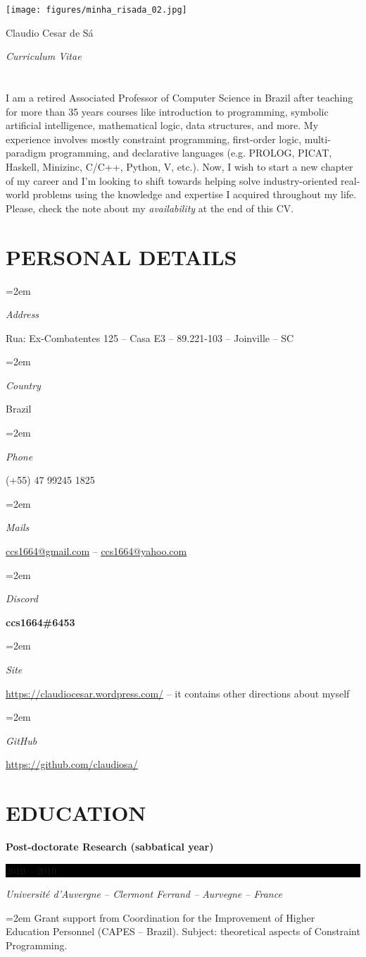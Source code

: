 \documentclass[paper=a4,fontsize=11pt]{scrartcl} %
\newlength{\spacebox}
\newcommand{\sepspace}{\vspace*{0.8em}}		%
\newcommand{\MyName}[1]{ %
		\Huge \usefont{OT1}{phv}{b}{n} \hfill #1
		\par \normalsize \normalfont}
\newcommand{\MySlogan}[1]{ %
		\large \usefont{OT1}{phv}{m}{n}\hfill \textit{#1}
		\par \normalsize \normalfont}
\newcommand{\NewPart}[1]{\section*{\uppercase{#1}}}
\newcommand{\PersonalEntry}[2]{
		\noindent\hangindent=2em\hangafter=0 %
		\parbox{\spacebox}{        %
		\textit{#1}}		       %
		\hspace{1.5em} #2 \par}    %
\newcommand{\EducationEntry}[4]{
		\noindent \textbf{#1} \hfill      %
		\colorbox{Black}{%
			\parbox{6em}{%
			\hfill\color{White}#2}} \par  %
		\noindent \textit{#3} \par        %
		\noindent\hangindent=2em\hangafter=0 \small #4 %
		\normalsize \par}
\begin{document}
\vspace*{-3em}
\texttt{[image: figures/minha\_risada\_02.jpg]}

\vspace{-1.5cm}
\MyName{Claudio Cesar de Sá}
\MySlogan{Curriculum Vitae}


\sepspace

\NewPart{}{}

I am a retired Associated Professor of Computer Science in Brazil after teaching for more than 35 years courses like introduction to programming, symbolic artificial intelligence, mathematical logic, data structures, and more. My experience involves mostly constraint programming, first-order logic, multi-paradigm programming, and declarative languages (e.g. PROLOG, PICAT, Haskell, Minizinc, C/C++, Python, V, etc.). Now, I wish to start a new chapter of my career and I'm looking to shift towards helping solve industry-oriented real-world problems using the knowledge and expertise I acquired throughout my life. Please, check the note about my {\em availability} at the end of this CV.
\sepspace

\NewPart{Personal details}{}

\PersonalEntry{Address}{Rua: Ex-Combatentes 125 -- Casa E3 -- 89.221-103 -- Joinville -- SC}
\PersonalEntry{Country}{Brazil}
\PersonalEntry{Phone}{(+55) 47 99245 1825}
\PersonalEntry{Mails}{\underline{\url{ccs1664@gmail.com}} -- \underline{\url{ccs1664@yahoo.com}}} \vspace{2mm}
\PersonalEntry{Discord}{\textbf{ccs1664\#6453}}
\PersonalEntry{Site}{\underline{\url{https://claudiocesar.wordpress.com/}} \hfill -- it contains other directions about myself}
\PersonalEntry{GitHub}{\underline{\url{https://github.com/claudiosa/}}}

\NewPart{Education}{}


\EducationEntry{Post-doctorate Research (sabbatical year)}{2010 -- 2010}{Université d'Auvergne -- Clermont Ferrand -- Aurvegne -- France}{Grant support from  Coordination for the Improvement of Higher Education Personnel (CAPES -- Brazil). Subject: theoretical aspects of Constraint Programming.}
\sepspace
\end{document}
